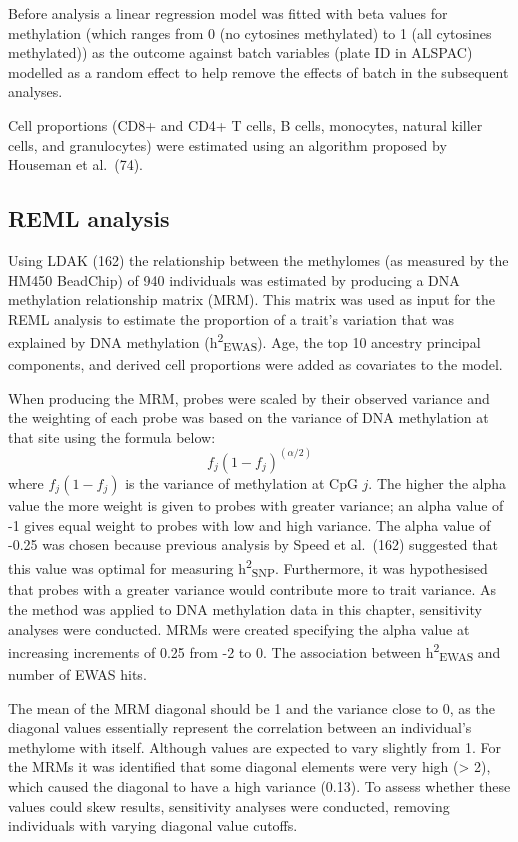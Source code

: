 \documentclass[11pt,oneside]{bristolthesis}
\begin{document}
Before analysis a linear regression model was fitted with beta values for methylation (which ranges from 0 (no cytosines methylated) to 1 (all cytosines methylated)) as the outcome against batch variables (plate ID in ALSPAC) modelled as a random effect to help remove the effects of batch in the subsequent analyses.

Cell proportions (CD8+ and CD4+ T cells, B cells, monocytes, natural killer cells, and granulocytes) were estimated using an algorithm proposed by Houseman et al.~(74).

\hypertarget{reml-analysis}{%
\subsection{REML analysis}\label{reml-analysis}}

Using LDAK (162) the relationship between the methylomes (as measured by the HM450 BeadChip) of 940 individuals was estimated by producing a DNA methylation relationship matrix (MRM). This matrix was used as input for the REML analysis to estimate the proportion of a trait's variation that was explained by DNA methylation (h\textsuperscript{2}\textsubscript{EWAS}). Age, the top 10 ancestry principal components, and derived cell proportions were added as covariates to the model.

When producing the MRM, probes were scaled by their observed variance and the weighting of each probe was based on the variance of DNA methylation at that site using the formula below:
\begin{equation}
    f_{j}(1-f_{j})^{(\alpha/2)}
    \label{eq:mrm-weights}
\end{equation}
where \(f_j(1-f_j)\) is the variance of methylation at CpG \(j\). The higher the alpha value the more weight is given to probes with greater variance; an alpha value of -1 gives equal weight to probes with low and high variance. The alpha value of -0.25 was chosen because previous analysis by Speed et al.~(162) suggested that this value was optimal for measuring h\textsuperscript{2}\textsubscript{SNP}. Furthermore, it was hypothesised that probes with a greater variance would contribute more to trait variance. As the method was applied to DNA methylation data in this chapter, sensitivity analyses were conducted. MRMs were created specifying the alpha value at increasing increments of 0.25 from -2 to 0. The association between h\textsuperscript{2}\textsubscript{EWAS} and number of EWAS hits.

The mean of the MRM diagonal should be 1 and the variance close to 0, as the diagonal values essentially represent the correlation between an individual's methylome with itself. Although values are expected to vary slightly from 1. For the MRMs it was identified that some diagonal elements were very high (\textgreater{} 2), which caused the diagonal to have a high variance (0.13). To assess whether these values could skew results, sensitivity analyses were conducted, removing individuals with varying diagonal value cutoffs.
\end{document}
